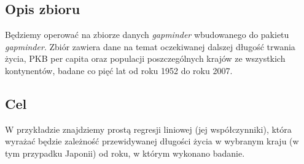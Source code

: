 \documentclass[a4paper]{article}
\begin{document}
\subsection{Opis zbioru}
Będziemy operować na zbiorze danych \textit{gapminder} wbudowanego do pakietu \textit{gapminder}. Zbiór zawiera dane na temat oczekiwanej dalszej długość trwania życia, PKB per capita oraz populacji poszczególnych krajów ze wszystkich kontynentów, badane co pięć lat od roku 1952 do roku 2007.

\subsection{Cel}
W przykładzie znajdziemy prostą regresji liniowej (jej współczynniki), która wyrażać będzie zależność przewidywanej długości życia w wybranym kraju (w tym przypadku Japonii) od roku, w którym wykonano badanie.
\end{document}
